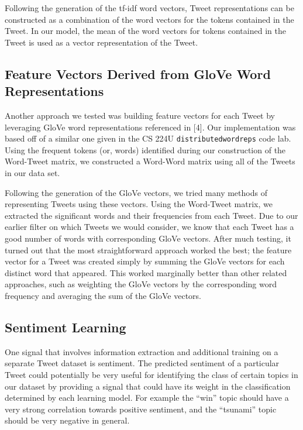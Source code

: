 \documentclass[11pt]{article}
\begin{document}
Following the generation of the tf-idf word vectors, Tweet representations can be constructed as a combination of the word vectors for the tokens contained in the Tweet. In our model, the mean of the word vectors for tokens contained in the Tweet is used as a vector representation of the Tweet.

\subsection{Feature Vectors Derived from GloVe Word Representations}

Another approach we tested was building feature vectors for each Tweet by leveraging GloVe word representations referenced in [4]. Our implementation was based off of a similar one given in the CS 224U \texttt{distributedwordreps} code lab. Using the frequent tokens (or, words) identified during our construction of the Word-Tweet matrix, we constructed a Word-Word matrix using all of the Tweets in our data set.

Following the generation of the GloVe vectors, we tried many methods of representing Tweets using these vectors. Using the Word-Tweet matrix, we extracted the significant words and their frequencies from each Tweet. Due to our earlier filter on which Tweets we would consider, we know that each Tweet has a good number of words with corresponding GloVe vectors. After much testing, it turned out that the most straightforward approach worked the best; the feature vector for a Tweet was created simply by summing the GloVe vectors for each distinct word that appeared. This worked marginally better than other related approaches, such as weighting the GloVe vectors by the corresponding word frequency and averaging the sum of the GloVe vectors.

\subsection{Sentiment Learning}

One signal that involves information extraction and additional training on a separate Tweet dataset is sentiment. The predicted sentiment of a particular Tweet could potentially be very useful for identifying the class of certain topics in our dataset by providing a signal that could have its weight in the classification determined by each learning model. For example the “win” topic should have a very strong correlation towards positive sentiment, and the “tsunami” topic should be very negative in general.
\end{document}
